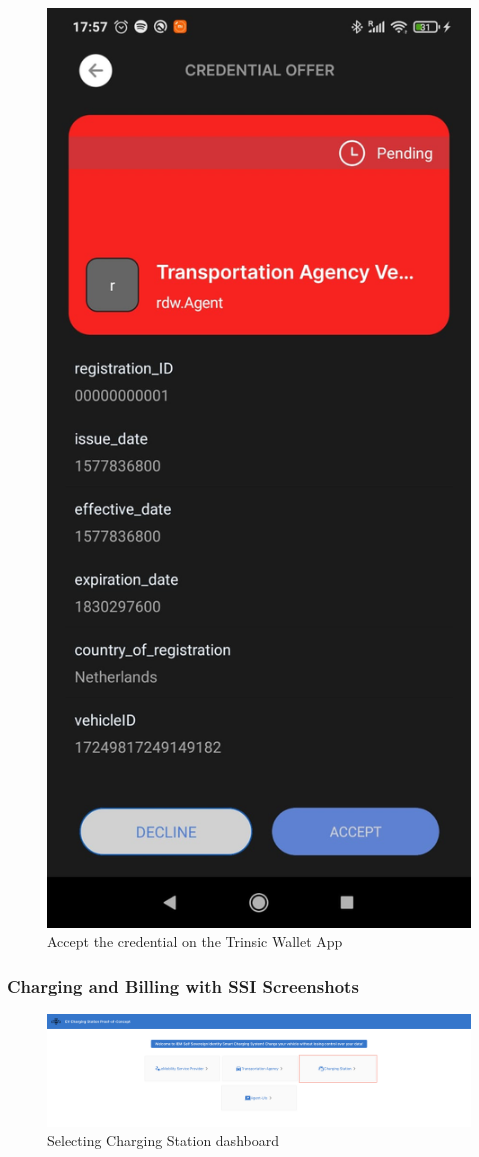 \begin{figure}[H]
    \centering
    \includegraphics[width=0.4\linewidth]{images/Frontend/Transportation_agency/Screenshot4.jpeg}
    \caption[]{Accept the credential on the Trinsic Wallet App}
    \label{fig:ev_owner_screenshot_4}
\end{figure}

\newpage

\subsubsection{Charging and Billing with SSI Screenshots}
\label{subapp:charging_and_billing}

\begin{figure}[H]
    \centering
    \includegraphics[width=\linewidth]{images/Frontend/Charging/1.0.png}
    \caption[]{Selecting Charging Station dashboard}
    \label{fig:charging_screenshot_1.0}
\end{figure}

